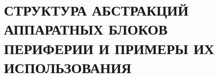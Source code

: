 \part{СТРУКТУРА АБСТРАКЦИЙ АППАРАТНЫХ БЛОКОВ ПЕРИФЕРИИ И ПРИМЕРЫ ИХ ИСПОЛЬЗОВАНИЯ}\label{module:op}
